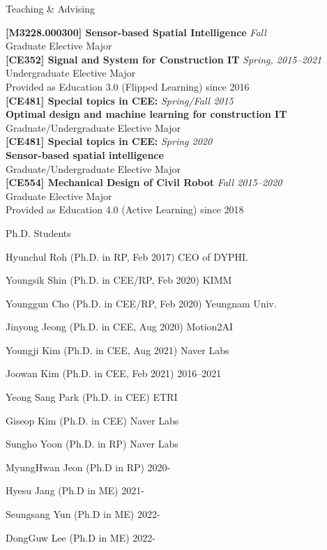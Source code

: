 \begin{rSection}{Teaching \& Advising}

{\bf[M3228.000300] Sensor-based Spatial Intelligence} \hfill {\em Fall} \\
Graduate Elective Major \\

{\bf[CE352] Signal and System for Construction IT} \hfill {\em Spring, 2015--2021} \\
Undergraduate Elective Major \\
Provided as Education 3.0 (Flipped Learning) since 2016\\

{\bf[CE481] Special topics in CEE:} \hfill {\em Spring/Fall 2015} \\
{\bf Optimal design and machine learning for construction IT}\\
Graduate/Undergraduate Elective Major \\

{\bf[CE481] Special topics in CEE:} \hfill {\em Spring 2020} \\
{\bf Sensor-based spatial intelligence}\\
Graduate/Undergraduate Elective Major \\

{\bf[CE554] Mechanical Design of Civil Robot } \hfill {\em Fall 2015--2020} \\
Graduate Elective Major \\
Provided as Education 4.0 (Active Learning) since 2018\\

\begin{rSubsection}{Ph.D. Students}{}{}{}
  \item Hyunchul Roh (Ph.D. in \acf{RP}, Feb 2017) \hfill CEO of DYPHI.
  \item Youngsik Shin (Ph.D. in \ac{CEE}/\ac{RP}, Feb 2020) \hfill KIMM
  \item Younggun Cho (Ph.D. in \ac{CEE}/\ac{RP}, Feb 2020) \hfill Yeungnam Univ.
  \item Jinyong Jeong (Ph.D. in \ac{CEE}, Aug 2020) \hfill Motion2AI
  \item Youngji Kim (Ph.D. in \ac{CEE}, Aug 2021) \hfill Naver Labs
  \item Joowan Kim (Ph.D. in \ac{CEE}, Feb 2021) \hfill 2016--2021
  \item Yeong Sang Park (Ph.D. in \ac{CEE}) \hfill ETRI
  \item Giseop Kim (Ph.D. in \ac{CEE}) \hfill Naver Labs
  \item Sungho Yoon (Ph.D. in \ac{RP}) \hfill Naver Labs
  \item MyungHwan Jeon (Ph.D in \ac{RP}) \hfill 2020-
  \item Hyesu Jang (Ph.D in \ac{ME}) \hfill 2021-
  \item Seungsang Yun (Ph.D in \ac{ME}) \hfill 2022-
  \item DongGuw Lee (Ph.D in \ac{ME}) \hfill 2022-
\end{rSubsection}


\end{rSection}
